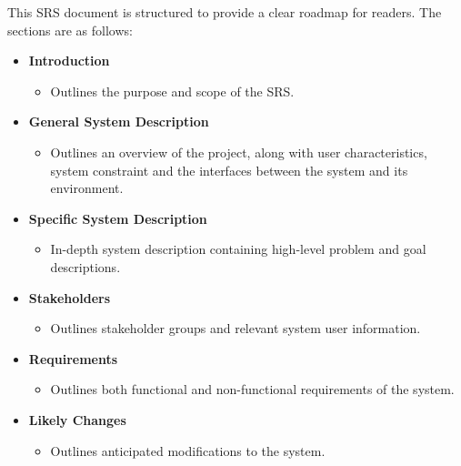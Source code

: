 This SRS document is structured to provide a clear roadmap for readers. The sections are as follows:

\begin{itemize}
   
    \item \textbf{Introduction} 
    \begin{itemize}
        \item Outlines the purpose and scope of the SRS.
    \end{itemize}
    
    \item \textbf{General System Description} 
    \begin{itemize}
        \item Outlines an overview of the project, along with user characteristics, system constraint and the interfaces between the system and its environment.
    \end{itemize}
    
    \item \textbf{Specific System Description} 
    \begin{itemize}
        \item In-depth system description containing high-level problem and goal descriptions.
    \end{itemize}
    
    \item \textbf{Stakeholders} 
    \begin{itemize}
        \item Outlines stakeholder groups and relevant system user information.
    \end{itemize}
    
    \item \textbf{Requirements} 
    \begin{itemize}
        \item Outlines both functional and non-functional requirements of the system.
    \end{itemize}
    
    \item \textbf{Likely Changes} 
    \begin{itemize}
        \item Outlines anticipated modifications to the system.
    \end{itemize}
    

\end{itemize}
